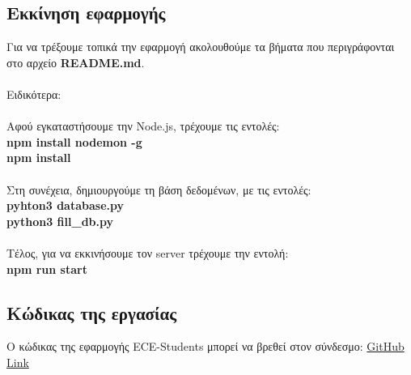\documentclass[manuscript,screen,review]{acmart}
\newcommand{\gr}[1]{\foreignlanguage{greek}{#1}}
\begin{document}
\subsection{\gr{Εκκίνηση εφαρμογής}}
\gr{Για να τρέξουμε τοπικά την εφαρμογή ακολουθούμε τα βήματα που περιγράφονται στο αρχείο} \textbf{README.md}.
\\
\\\gr{Ειδικότερα:}
\\
\\\gr{Αφού εγκαταστήσουμε την} Node.js, \gr{τρέχουμε τις εντολές:}
\\\textbf{npm install nodemon -g}
\\\textbf{npm install}
\\
\\\gr{Στη συνέχεια, δημιουργούμε τη βάση δεδομένων, με τις εντολές:}
\\\textbf{pyhton3 database.py}
\\\textbf{python3 fill\_db.py}
\\
\\\gr{Τέλος, για να εκκινήσουμε τον} server \gr{τρέχουμε την εντολή:}
\\\textbf{npm run start}

\subsection{\gr{Κώδικας της εργασίας}}
\gr{Ο κώδικας της εφαρμογής} ECE-Students \gr{μπορεί να βρεθεί στον σύνδεσμο:}
\href{https://github.com/NektariaVer/---------}{GitHub Link}
\end{document}
